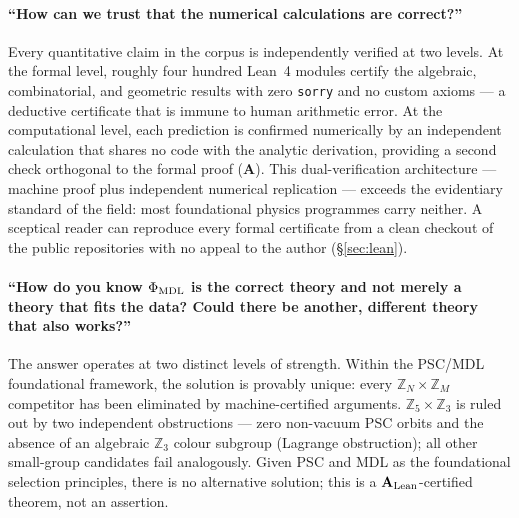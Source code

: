 \documentclass[11pt]{article}
\newcommand{\CatA}{\textbf{A}}
\newcommand{\CatAL}{\ensuremath{\textbf{A}_{\rm Lean}}}
\begin{document}
\paragraph{``How can we trust that the numerical calculations are correct?''}
Every quantitative claim in the corpus is independently verified at two levels.  At the
formal level, roughly four hundred Lean~4 modules certify the algebraic, combinatorial,
and geometric results with zero \texttt{sorry} and no custom axioms --- a deductive
certificate that is immune to human arithmetic error.  At the computational level, each
prediction is confirmed numerically by an independent calculation that shares no code
with the analytic derivation, providing a second check orthogonal to the formal proof
(\CatA).  This dual-verification architecture --- machine proof plus independent
numerical replication --- exceeds the evidentiary standard of the field: most
foundational physics programmes carry neither.  A sceptical reader can reproduce every
formal certificate from a clean checkout of the public repositories with no appeal to
the author (§\ref{sec:lean}).

\paragraph{``How do you know $\Phi_{\rm MDL}$ is the correct theory and not merely a
theory that fits the data?  Could there be another, different theory that also works?''}
The answer operates at two distinct levels of strength.  Within the PSC/MDL
foundational framework, the solution is provably unique: every
$\mathbb{Z}_N\times\mathbb{Z}_M$ competitor has been eliminated by machine-certified
arguments.  $\mathbb{Z}_5\times\mathbb{Z}_3$ is ruled out by two independent
obstructions --- zero non-vacuum PSC orbits and the absence of an algebraic
$\mathbb{Z}_3$ colour subgroup (Lagrange obstruction); all other small-group candidates
fail analogously.  Given PSC and MDL as the foundational selection principles, there is
no alternative solution; this is a \CatAL{}-certified theorem, not an assertion.
\end{document}
